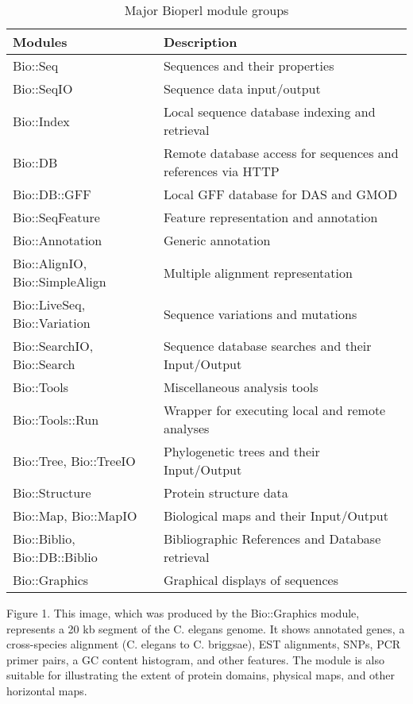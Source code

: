 \documentclass[12pt]{article}
\begin{document}
\begin{table}[h]
\begin{tabular}{|l|l|}
\hline
\textbf{Modules} & \textbf{Description} \\
\hline
Bio::Seq &  Sequences and their properties \\
Bio::SeqIO & Sequence data input/output \\
Bio::Index & Local sequence database indexing and retrieval \\ 
Bio::DB & Remote database access for sequences and references via HTTP \\
Bio::DB::GFF & Local GFF database for DAS and GMOD \\
Bio::SeqFeature & Feature representation and annotation \\
Bio::Annotation & Generic annotation \\
Bio::AlignIO, Bio::SimpleAlign & Multiple alignment representation \\
Bio::LiveSeq, Bio::Variation & Sequence variations and mutations \\
Bio::SearchIO, Bio::Search  & Sequence database searches and their Input/Output \\
Bio::Tools &  Miscellaneous analysis tools \\
Bio::Tools::Run &  Wrapper for executing local and remote analyses \\
Bio::Tree, Bio::TreeIO & Phylogenetic trees and their Input/Output  \\
Bio::Structure & Protein structure data \\
Bio::Map, Bio::MapIO & Biological maps and their Input/Output \\
Bio::Biblio, Bio::DB::Biblio & Bibliographic References and Database
retrieval \\ 
Bio::Graphics & Graphical displays of sequences \\
\hline
\end{tabular}
\caption{Major Bioperl module groups}
\label{tab:modules}
\end{table}

\newpage


Figure 1. This image, which was produced by the Bio::Graphics module,
represents a 20 kb segment of the C. elegans genome. It shows
annotated genes, a cross-species alignment (C. elegans to
C. briggsae), EST alignments, SNPs, PCR primer pairs, a GC content
histogram, and other features.  The module is also suitable for
illustrating the extent of protein domains, physical maps, and other
horizontal maps.
\end{document}
